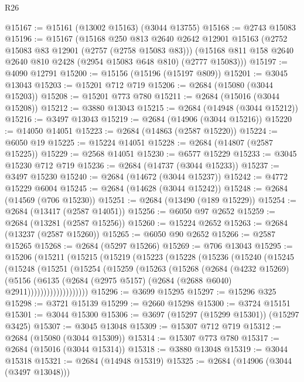 \begin{lexlean}{R26}
\begin{coremodule}
@15167 := @15161 (@13002 @15163) (@3044 @13755)
@15168 := @2743 @15083
@15196 := @15167
    (@15168
      @250
      @813
      @2640
      @2642
      @12901
      @15163
      (@2752 @15083 @83 @12901 (@2757 (@2758 @15083 @83)))
      (@15168 @811 @158 @2640 @2640 @810 @2428 (@2954 @15083 @648 @810) (@2777 @15083)))
@15197 := @4090 @12791
@15200 := @15156 (@15196 (@15197 @809))
@15201 := @3045 @13043
@15203 := @15201 @712 @719
@15206 := @2684 (@15080 (@3044 @15203))
@15208 := @15201 @773 @780
@15211 := @2684 (@15016 (@3044 @15208))
@15212 := @3880 @13043
@15215 := @2684 (@14948 (@3044 @15212))
@15216 := @3497 @13043
@15219 := @2684 (@14906 (@3044 @15216))
@15220 := @14050 @14051
@15223 := @2684 (@14863 (@2587 @15220))
@15224 := @6050 @19
@15225 := @15224 @14051
@15228 := @2684 (@14807 (@2587 @15225))
@15229 := @2568 @14051
@15230 := @6577 @15229
@15233 := @3045 @15230 @712 @719
@15236 := @2684 (@14737 (@3044 @15233))
@15237 := @3497 @15230
@15240 := @2684 (@14672 (@3044 @15237))
@15242 := @4772 @15229 @6004
@15245 := @2684 (@14628 (@3044 @15242))
@15248 := @2684 (@14569 (@706 @15230))
@15251 := @2684 (@13490 (@189 @15229))
@15254 := @2684 (@13417 (@2587 @14051))
@15256 := @6050 @97 @2652
@15259 := @2684 (@13281 (@2587 @15256))
@15260 := @15224 @2652
@15263 := @2684 (@13237 (@2587 @15260))
@15265 := @6050 @90 @2652
@15266 := @2587 @15265
@15268 := @2684 (@5297 @15266)
@15269 := @706 @13043
@15295 := @15206
    (@15211
      (@15215
        (@15219
          (@15223
            (@15228
              (@15236
                (@15240
                  (@15245
                    (@15248
                      (@15251
                        (@15254
                          (@15259
                            (@15263
                              (@15268
                                (@2684
                                  (@4232 @15269)
                                  (@5156
                                    (@6135
                                      (@2684
                                        (@2975 @5157)
                                        (@2684 (@2688 @6040) @2911)))))))))))))))))))
@15296 := @3699 @15295
@15297 := @15296 @325
@15298 := @3721 @15139
@15299 := @2660 @15298
@15300 := @3724 @15151
@15301 := @3044 @15300
@15306 := @3697 (@15297 (@15299 @15301)) (@15297 @3425)
@15307 := @3045 @13048
@15309 := @15307 @712 @719
@15312 := @2684 (@15080 (@3044 @15309))
@15314 := @15307 @773 @780
@15317 := @2684 (@15016 (@3044 @15314))
@15318 := @3880 @13048
@15319 := @3044 @15318
@15321 := @2684 (@14948 @15319)
@15325 := @2684 (@14906 (@3044 (@3497 @13048)))

\end{coremodule}
\end{lexlean}
